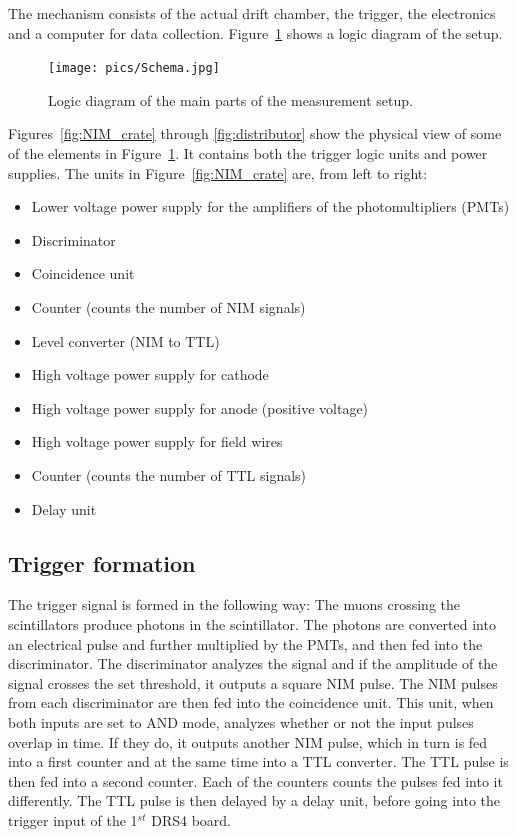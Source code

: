 \documentclass[12pt]{article}
\begin{document}
The mechanism consists of the actual drift chamber, the trigger, the electronics and a computer for data collection. Figure~\ref{fig:schema} shows a logic diagram of the setup. 

\begin{figure}[!h]
\texttt{[image: pics/Schema.jpg]}
\centering
\caption{Logic diagram of the main parts of the measurement setup.}
\label{fig:schema}
\end{figure}

Figures~\ref{fig:NIM_crate} through \ref{fig:distributor} show the physical view of some of the elements in Figure~\ref{fig:schema}. It contains both the trigger logic units and power supplies. The units in Figure~\ref{fig:NIM_crate} are, from left to right:
\begin{itemize}
\item Lower voltage power supply for the amplifiers of the photomultipliers (PMTs)
\item Discriminator
\item Coincidence unit
\item Counter (counts the number of NIM signals)
\item Level converter (NIM to TTL)
\item High voltage power supply for cathode
\item High voltage power supply for anode (positive voltage)
\item High voltage power supply for field wires
\item Counter (counts the number of TTL signals)
\item Delay unit
\end{itemize}

\subsection{Trigger formation}
The trigger signal is formed in the following way: The muons crossing the scintillators produce photons in the scintillator. The photons are converted into an electrical pulse and further multiplied by the PMTs, and then fed into the discriminator. The discriminator analyzes the signal and if the amplitude of the signal crosses the set threshold, it outputs a square NIM pulse. The NIM pulses from each discriminator are then fed into the coincidence unit. This unit, when both inputs are set to AND mode, analyzes whether or not the input pulses overlap in time.
If they do, it outputs another NIM pulse, which in turn is fed into a first counter and at the same time into a TTL converter. The TTL pulse is then fed into a second counter. Each of the counters counts the pulses fed into it differently. The TTL pulse is then delayed by a delay unit, before going into the trigger input of the 1$^{st}$ DRS4 board.
\end{document}
